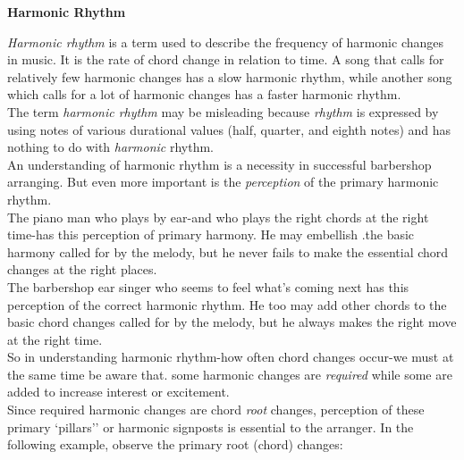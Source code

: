 \documentclass{article} %
\numberwithin{equation}{section} %
\begin{document}
	\begin{center}
		\textbf{Harmonic Rhythm}\\
	\end{center}


		\textit{Harmonic rhythm} is a term used to describe the frequency of harmonic changes in music. It is the rate of chord change in relation to time. A song that calls for relatively few harmonic changes has a slow harmonic rhythm, while another song which calls for a lot of harmonic changes has a faster harmonic rhythm. \\

		The term \textit{harmonic rhythm} may be misleading because \textit{rhythm} is expressed by using notes of various durational values (half, quarter, and eighth notes) and has nothing to do with \textit{harmonic} rhythm. \\

		An understanding of harmonic rhythm is a necessity in successful barbershop arranging. But even more important is the \textit{perception} of the primary harmonic rhythm. \\

		The piano man who plays by ear-and who plays the right chords at the right time-has this perception of primary harmony. He may embellish .the basic harmony called for by the melody, but he never fails to make the essential chord changes at the right places. \\

		The barbershop ear singer who seems to feel what's coming next has this perception of the correct harmonic rhythm. He too may add other chords to the basic chord changes called for by the melody, but he always makes the right move at the right time. \\

		So in understanding harmonic rhythm-how often chord changes occur-we must at the same time be aware that. some harmonic changes are \textit{required} while some are added to increase interest or excitement. \\

		Since required harmonic changes are chord \textit{root} changes, perception of these primary `pillars'' or harmonic signposts is essential to the arranger. In the following example, observe the primary root (chord) changes: \\
\end{document}
